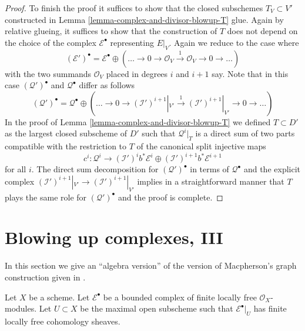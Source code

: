 \begin{proof}
\medskip\noindent
To finish the proof it suffices to show that the closed subschemes
$T_V \subset V'$ constructed in Lemma \ref{lemma-complex-and-divisor-blowup-T}
glue. Again by relative glueing, it suffices to show that the construction
of $T$ does not depend on the choice of the complex $\mathcal{E}^\bullet$
representing $E|_V$. Again we reduce to the case where
$$
(\mathcal{E}')^\bullet =
\mathcal{E}^\bullet \oplus ( \ldots \to 0 \to
\mathcal{O}_V \xrightarrow{1} \mathcal{O}_V \to 0 \to \ldots)
$$
with the two summands $\mathcal{O}_V$ placed in degrees $i$ and $i + 1$ say.
Note that in this case $(\mathcal{Q}')^\bullet$ and $\mathcal{Q}^\bullet$
differ as follows
$$
(\mathcal{Q}')^\bullet = \mathcal{Q}^\bullet \oplus
( \ldots \to 0 \to
(\mathcal{I}')^{i + 1}|_{V'} \xrightarrow{1}
(\mathcal{I}')^{i + 1}|_{V'} \to 0 \to \ldots)
$$
In the proof of Lemma \ref{lemma-complex-and-divisor-blowup-T}
we defined $T \subset D'$ as the largest closed subscheme of $D'$ such
that $\mathcal{Q}^i|_T$ is a direct sum of two parts compatible with
the restriction to $T$ of the canonical split injective maps
$$
c^i :
\mathcal{Q}^i
\longrightarrow
(\mathcal{I}')^ib^*\mathcal{E}^i \oplus
(\mathcal{I}')^{i + 1}b^*\mathcal{E}^{i + 1}
$$
for all $i$. The direct sum decomposition for $(\mathcal{Q}')^\bullet$
in terms of $\mathcal{Q}^\bullet$ and the explicit complex
$(\mathcal{I}')^{i + 1}|_{V'} \to (\mathcal{I}')^{i + 1}|_{V'}$
implies in a straightforward manner that $T$ plays the same
role for $(\mathcal{Q}')^\bullet$ and the proof is complete.
\end{proof}










\section{Blowing up complexes, III}
\label{section-blowup-complexes-III}

\noindent
In this section we give an ``algebra version'' of the version of
Macpherson's graph construction given in \cite[Section 18.1]{F}.

\medskip\noindent
Let $X$ be a scheme. Let $\mathcal{E}^\bullet$ be a bounded complex of
finite locally free $\mathcal{O}_X$-modules. Let $U \subset X$ be the
maximal open subscheme such that $\mathcal{E}^\bullet|_U$ has finite
locally free cohomology sheaves.

